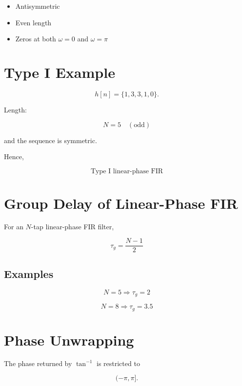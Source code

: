\begin{itemize}
\item Antisymmetric
\item Even length
\item Zeros at both \(\omega=0\) and \(\omega=\pi\)
\end{itemize}


\section{Type I Example}

\[
h[n]=\{1,3,3,1,0\}.
\]

Length:

\[
N=5 \quad (\text{odd})
\]

and the sequence is symmetric.

Hence,

\[
\boxed{
\text{Type I linear-phase FIR}
}
\]


\section{Group Delay of Linear-Phase FIR}

For an \(N\)-tap linear-phase FIR filter,

\[
\boxed{
\tau_g=
\frac{N-1}{2}
}
\]


\subsection{Examples}

\[
N=5 \Rightarrow \tau_g=2
\]

\[
N=8 \Rightarrow \tau_g=3.5
\]


\section{Phase Unwrapping}

The phase returned by \(\tan^{-1}\) is restricted to

\[
(-\pi,\pi].
\]

